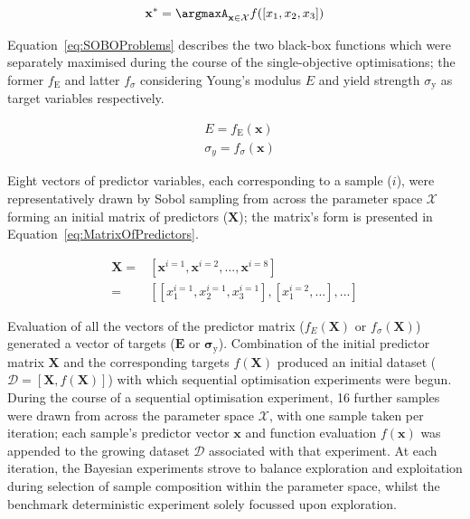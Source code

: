 \begin{equation}\label{eq:GoverningOptimisation}
    \mathbf{x}^{*}=\argmaxA_{\mathbf{x}\in\mathcal{X}} f([x_{1},x_{2},x_{3}])
\end{equation}

Equation~\ref{eq:SOBOProblems} describes the two black-box functions which
 were separately maximised during the course of the single-objective
 optimisations; the former \(f_{\mathrm{E}}\) and latter \(f_{\sigma}\) considering
 Young's modulus \(E\) and yield strength \(\sigma_{\mathrm{y}}\) as target variables
 respectively.

\begin{equation}\label{eq:SOBOProblems}
    \begin{split}
        &E=f_{\mathrm{E}}(\mathbf{x})\\
        &\sigma_{y}=f_{\sigma}(\mathbf{x})
    \end{split}
\end{equation}

Eight vectors of predictor variables, each corresponding to a sample (\(i\)),
 were representatively drawn by Sobol sampling from across the parameter
 space \(\mathcal{X}\) forming an initial matrix of predictors (\(\mathbf{X}\)); the
 matrix's form is presented in Equation~\ref{eq:MatrixOfPredictors}.

\begin{equation}\label{eq:MatrixOfPredictors}
    \begin{split}
        \mathbf{X}=&[\mathbf{x}^{i=1},\mathbf{x}^{i=2},...,\mathbf{x}^{i=8}]\\
        =&[[x_{1}^{i=1},x_{2}^{i=1},x_{3}^{i=1}],[x_{1}^{i=2},...],...]
    \end{split}
\end{equation}

Evaluation of all the vectors of the predictor matrix (\(f_{E}(\mathbf{X})\)
 or \(f_{\sigma}(\mathbf{X})\)) generated a vector of targets (\(\mathbf{E}\) or
 \(\bm{\sigma_{\mathrm{y}}}\)).
Combination of the initial predictor matrix \(\mathbf{X}\) and the
 corresponding targets \(f(\mathbf{X})\) produced an initial dataset
 (\(\mathcal{D}=[\mathbf{X},f(\mathbf{X})]\)) with which sequential
 optimisation experiments were begun.
During the course of a sequential optimisation experiment, 16 further samples
 were drawn from across the parameter space \(\mathcal{X}\), with one sample taken per
 iteration; each sample's predictor vector \(\mathbf{x}\) and function
 evaluation \(f(\mathbf{x})\) was appended to the growing dataset
 \(\mathcal{D}\) associated with that experiment.
At each iteration, the Bayesian experiments strove to balance exploration and
 exploitation during selection of sample composition within the parameter
 space, whilst the benchmark deterministic experiment solely focussed upon
 exploration.

